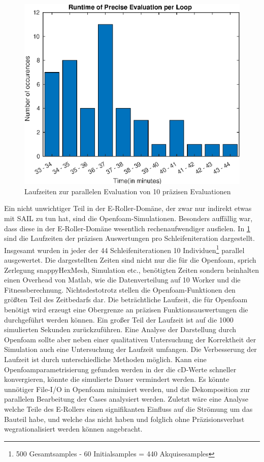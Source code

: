 \begin{figure}[h]
	\centering
	\includegraphics[width=.7\linewidth]{bilder/escooter/peRuntime}
	\caption{Laufzeiten zur parallelen Evaluation von 10 präzisen Evaluationen}
	\label{fig:escooterpeRuntime}
\end{figure}

Ein nicht unwichtiger Teil in der E-Roller-Domäne, der zwar nur indirekt etwas mit SAIL zu tun hat, sind die Openfoam-Simulationen.
Besonders auffällig war, dass diese in der E-Roller-Domäne wesentlich rechenaufwendiger ausfielen.
In \cref{fig:escooterpeRuntime} sind die Laufzeiten der präzisen Auswertungen pro Schleifeniteration dargestellt.
Insgesamt wurden in jeder der 44 Schleifeniterationen 10 Individuen\footnote{500 Gesamtsamples - 60 Initialsamples = 440 Akquisesamples} parallel ausgewertet.
Die dargestellten Zeiten sind nicht nur die für die Openfoam, sprich Zerlegung snappyHexMesh, Simulation etc., benötigten Zeiten sondern beinhalten einen Overhead von Matlab, wie die Datenverteilung auf 10 Worker und die Fitnessberechnung.
Nichtsdestotrotz stellen die Openfoam-Funktionen den größten Teil des Zeitbedarfs dar.
Die beträchtliche Laufzeit, die für Openfoam benötigt wird erzeugt eine Obergrenze an präzisen Funktionsauswertungen die durchgeführt werden können.
Ein großer Teil der Laufzeit ist auf die 1000 simulierten Sekunden zurückzuführen.
Eine Analyse der Darstellung durch Openfoam sollte aber neben einer qualitativen Untersuchung der Korrektheit der Simulation auch eine Untersuchung der Laufzeit umfangen.
Die Verbesserung der Laufzeit ist durch unterschiedliche Methoden möglich.
Kann eine Openfoamparametrisierung gefunden werden in der die cD-Werte schneller konvergieren, könnte die simulierte Dauer vermindert werden.
Es könnte unnötiger File-I/O in Openfoam minimiert werden, und die Dekomposition zur parallelen Bearbeitung der Cases analysiert werden.
Zuletzt wäre eine Analyse welche Teile des E-Rollers einen signifikanten Einfluss auf die Strömung um das Bauteil habe, und welche das nicht haben und folglich ohne Präzisionsverlust wegrationalisiert werden können angebracht.


